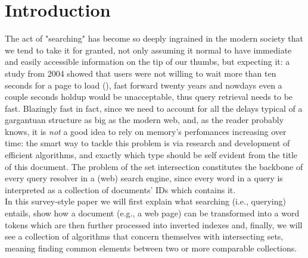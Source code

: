 \chapter{Introduction\label{intro}}

The act of "searching" has become so deeply ingrained in the modern society that we tend to take it for granted, not only assuming it normal to have immediate and easily accessible information on the tip of our thumbs, but expecting it: a study from 2004 showed that users were not willing to wait more than ten seconds for a page to load (\cite{waitTime}), fast forward twenty years and nowdays even a couple seconds holdup would be unacceptable, thus query retrieval needs to be fast. Blazingly fast in fact, since we need to account for all the delays typical of a gargantuan structure as big as the modern web, and, as the reader probably knows, it is \textit{not} a good idea to rely on memory's perfomances increasing over time: the smart way to tackle this problem is via research and development of efficient algorithms, and exactly which type should be self evident from the title of this document. The problem of the set intersection constitutes the backbone of every query resolver in a (web) search engine, since every word in a query is interpreted as a collection of documents' IDs which contains it. \\
In this survey-style paper we will first explain what searching (i.e., querying) entails, show how a document (e.g., a web page) can be transformed into a word tokens which are then further processed into inverted indexes and, finally, we will see a collection of algorithms that concern themselves with intersecting sets, meaning finding common elements between two or more comparable collections. 
